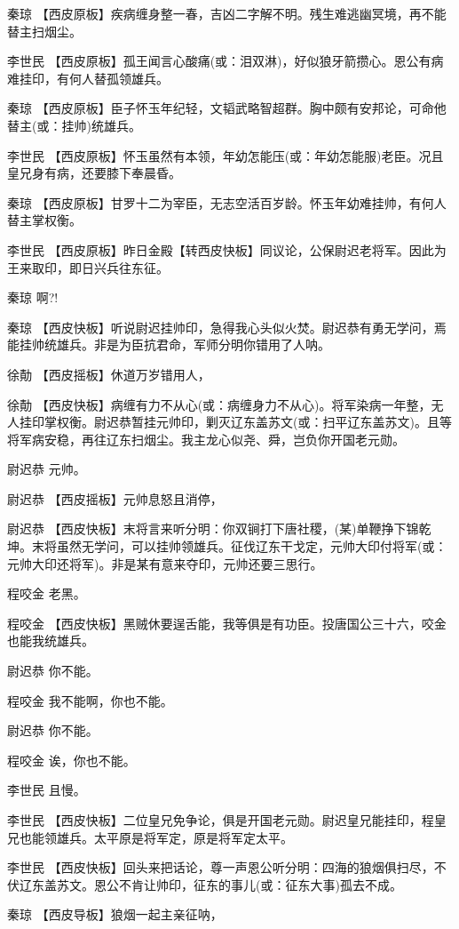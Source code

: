 秦琼
【西皮原板】疾病缠身整一春，吉凶二字解不明。残生难逃幽冥境，再不能替主扫烟尘。

李世民
【西皮原板】孤王闻言心酸痛(或：泪双淋)，好似狼牙箭攒心。恩公有病难挂印，有何人替孤领雄兵。

秦琼
【西皮原板】臣子怀玉年纪轻，文韬武略智超群。胸中颇有安邦论，可命他替主(或：挂帅)统雄兵。

李世民
【西皮原板】怀玉虽然有本领，年幼怎能压(或：年幼怎能服)老臣。况且皇兄身有病，还要膝下奉晨昏。

秦琼
【西皮原板】甘罗十二为宰臣，无志空活百岁龄。怀玉年幼难挂帅，有何人替主掌权衡。

李世民
【西皮原板】昨日金殿【转西皮快板】同议论，公保尉迟老将军。因此为王来取印，即日兴兵往东征。

秦琼 啊?!

秦琼
【西皮快板】听说尉迟挂帅印，急得我心头似火焚。尉迟恭有勇无学问，焉能挂帅统雄兵。非是为臣抗君命，军师分明你错用了人呐。

徐勣 【西皮摇板】休道万岁错用人，

徐勣
【西皮快板】病缠有力不从心(或：病缠身力不从心)。将军染病一年整，无人挂印掌权衡。尉迟恭暂挂元帅印，剿灭辽东盖苏文(或：扫平辽东盖苏文)。且等将军病安稳，再往辽东扫烟尘。我主龙心似尧、舜，岂负你开国老元勋。

尉迟恭 元帅。

尉迟恭 【西皮摇板】元帅息怒且消停，

尉迟恭
【西皮快板】末将言来听分明：你双锏打下唐社稷，(某)单鞭挣下锦乾坤。末将虽然无学问，可以挂帅领雄兵。征伐辽东干戈定，元帅大印付将军(或：元帅大印还将军)。非是某有意来夺印，元帅还要三思行。

程咬金 老黑。

程咬金
【西皮快板】黑贼休要逞舌能，我等俱是有功臣。投唐国公三十六，咬金也能我统雄兵。

尉迟恭 你不能。

程咬金 我不能啊，你也不能。

尉迟恭 你不能。

程咬金 诶，你也不能。

李世民 且慢。

李世民
【西皮快板】二位皇兄免争论，俱是开国老元勋。尉迟皇兄能挂印，程皇兄也能领雄兵。太平原是将军定，原是将军定太平。

李世民
【西皮快板】回头来把话论，尊一声恩公听分明：四海的狼烟俱扫尽，不伏辽东盖苏文。恩公不肯让帅印，征东的事儿(或：征东大事)孤去不成。

秦琼 【西皮导板】狼烟一起主亲征呐，

